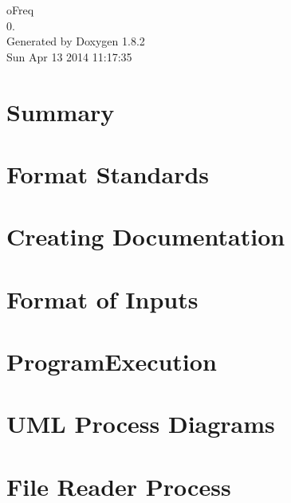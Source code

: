 \documentclass{book}
\begin{document}
\hypersetup{pageanchor=false,citecolor=blue}
\begin{titlepage}
\vspace*{7cm}
\begin{center}
{\Large o\-Freq \\[1ex]\large 0. }\\
\vspace*{1cm}
{\large Generated by Doxygen 1.8.2}\\
\vspace*{0.5cm}
{\small Sun Apr 13 2014 11:17:35}\\
\end{center}
\end{titlepage}
\clearemptydoublepage
{}
\tableofcontents
\clearemptydoublepage
{}
\hypersetup{pageanchor=true,citecolor=blue}
\chapter{Summary}
\label{index}\hypertarget{index}{}
\chapter{Format Standards}
\label{Coding}
\hypertarget{Coding}{}

\chapter{Creating Documentation}
\label{documentation}
\hypertarget{documentation}{}

\chapter{Format of Inputs}
\label{InputFormatting}
\hypertarget{InputFormatting}{}

\chapter{Program\-Execution}
\label{ProgramExecution}
\hypertarget{ProgramExecution}{}

\chapter{U\-M\-L Process Diagrams}
\label{UML_Process}
\hypertarget{UML_Process}{}

\chapter{File Reader Process}
\label{UML_FileReader}
\hypertarget{UML_FileReader}{}

\end{document}
